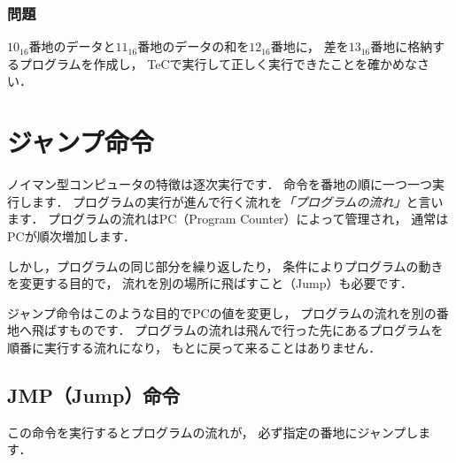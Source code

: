 \vfill
\subsubsection{問題}
$10_{16}$番地のデータと$11_{16}$番地のデータの和を$12_{16}$番地に，
差を$13_{16}$番地に格納するプログラムを作成し，
TeCで実行して正しく実行できたことを確かめなさい．
\vfill

\newpage
\section{ジャンプ命令}
ノイマン型コンピュータの特徴は逐次実行です．
命令を番地の順に一つ一つ実行します．
プログラムの実行が進んで行く流れを\emph{「プログラムの流れ」}と言います．
プログラムの流れはPC（Program Counter）によって管理され，
通常はPCが順次増加します．

しかし，プログラムの同じ部分を繰り返したり，
条件によりプログラムの動きを変更する目的で，
流れを別の場所に飛ばすこと（Jump）も必要です．

ジャンプ命令はこのような目的でPCの値を変更し，
プログラムの流れを別の番地へ飛ばすものです．
プログラムの流れは飛んで行った先にあるプログラムを順番に実行する流れになり，
もとに戻って来ることはありません．

\subsection{JMP（Jump）命令}
この命令を実行するとプログラムの流れが，
必ず指定の番地にジャンプします．

